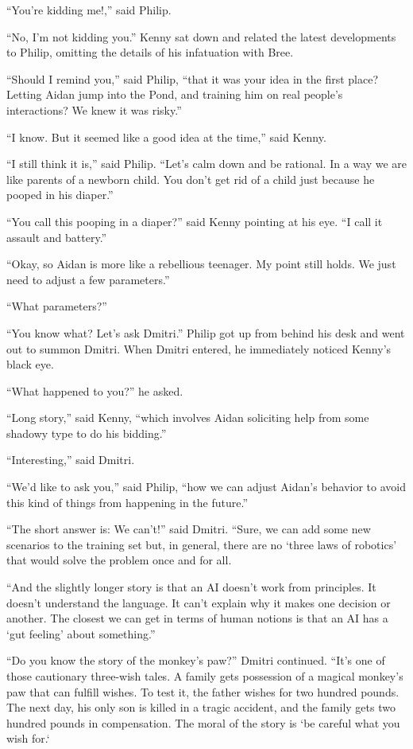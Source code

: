 \documentclass{memoir}
\begin{document}
``You're kidding me!,'' said Philip.

``No, I'm not kidding you.'' Kenny sat down and related the latest developments to Philip, omitting the details of his infatuation with Bree. 

``Should I remind you,'' said Philip, ``that it was your idea in the first place? Letting Aidan jump into the Pond, and training him on real people's interactions? We knew it was risky.''

``I know. But it seemed like a good idea at the time,'' said Kenny.

``I still think it is,'' said Philip. ``Let's calm down and be rational. In a way we are like parents of a newborn child. You don't get rid of a child just because he pooped in his diaper.''

``You call this pooping in a diaper?'' said Kenny pointing at his eye. ``I call it assault and battery.''

``Okay, so Aidan is more like a rebellious teenager. My point still holds. We just need to adjust a few parameters.''

``What parameters?'' 

``You know what? Let's ask Dmitri.'' Philip got up from behind his desk and went out to summon Dmitri. When Dmitri entered, he immediately noticed Kenny's black eye.

``What happened to you?'' he asked.

``Long story,'' said Kenny, ``which involves Aidan soliciting help from some shadowy type to do his bidding.''

``Interesting,'' said Dmitri. 

``We'd like to ask you,'' said Philip, ``how we can adjust Aidan's behavior to avoid this kind of things from happening in the future.''

``The short answer is: We can't!'' said Dmitri. ``Sure, we can add some new scenarios to the training set but, in general, there are no `three laws of robotics' that would solve the problem once and for all. 

``And the slightly longer story is that an AI doesn't work from principles. It doesn't understand the language. It can't explain why it makes one decision or another. The closest we can get in terms of human notions is that an AI has a `gut feeling' about something.''

``Do you know the story of the monkey's paw?'' Dmitri continued. ``It's one of those cautionary three-wish tales. A family gets possession of a magical monkey's paw that can fulfill wishes. To test it, the father wishes for two hundred pounds. The next day, his only son is killed in a tragic accident, and the family gets two hundred pounds in compensation. The moral of the story is `be careful what you wish for.` 
\end{document}
